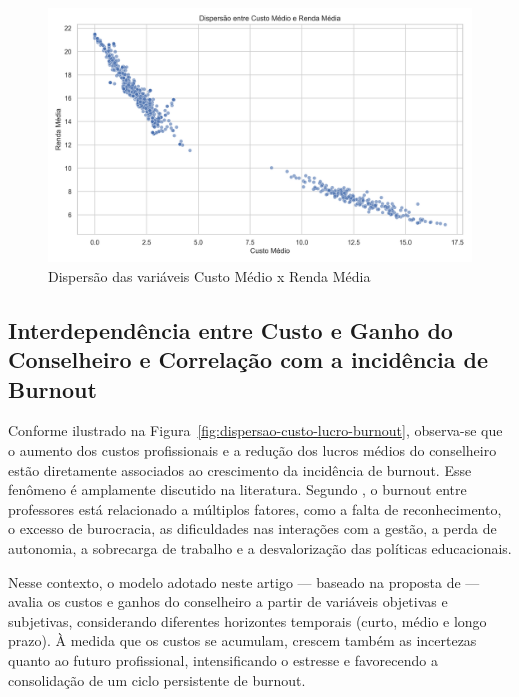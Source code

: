 \documentclass[
	article,			%
	11pt,				%
	oneside,			%
	a4paper,			%
	english,			%
	brazil,				%
	sumario=tradicional
	]{abntex2}
\begin{document}
\begin{figure}[H]
    \centering
    \includegraphics[width=1\textwidth]{imagens/dispersao-custo-ganho.png}
    \caption{Dispersão das variáveis Custo Médio x Renda Média}
    \label{fig:dispersao-custo-ganho}
\end{figure}

\subsection{Interdependência entre Custo e Ganho do Conselheiro e Correlação com a incidência de Burnout}

\begin{sloppypar}    
Conforme ilustrado na Figura~\ref{fig:dispersao-custo-lucro-burnout}, observa-se que o aumento dos custos profissionais e a redução dos lucros médios do conselheiro estão diretamente associados ao crescimento da incidência de burnout. 
Esse fenômeno é amplamente discutido na literatura. Segundo , o burnout entre professores está relacionado a múltiplos fatores, como a falta de reconhecimento, o excesso de burocracia, as dificuldades nas interações com a gestão, a perda de autonomia, a sobrecarga de trabalho e a desvalorização das políticas educacionais.

Nesse contexto, o modelo adotado neste artigo — baseado na proposta de  — avalia os custos e ganhos do conselheiro a partir de variáveis objetivas e subjetivas, considerando diferentes horizontes temporais (curto, médio e longo prazo). À medida que os custos se acumulam, crescem também as incertezas quanto ao futuro profissional, intensificando o estresse e favorecendo a consolidação de um ciclo persistente de burnout.
\end{sloppypar}
\end{document}
